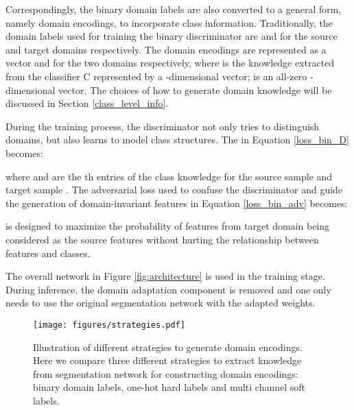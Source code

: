 \documentclass[runningheads]{llncs}
\begin{document}
Correspondingly, the binary domain labels are also converted to a general form, namely domain encodings, to incorporate class information. Traditionally, the domain labels used for training the binary discriminator are  and  for the source and target domains respectively. The domain encodings are represented as a vector  and  for the two domains respectively, where  is the knowledge extracted from the classifier C represented by a -dimensional vector;  is an all-zero -dimensional vector. The choices of how to generate domain knowledge  will be discussed in Section \ref{class_level_info}.



During the training process, the discriminator not only tries to distinguish domains, but also learns to model class structures. The  in Equation \ref{loss_bin_D} becomes: 





where  and  are the th entries of the class knowledge for the source sample  and target sample . The adversarial loss  used to confuse the discriminator and guide the generation of domain-invariant features in Equation \ref{loss_bin_adv}  becomes:






 is designed to maximize the probability of features from target domain being considered as the source features without hurting the relationship between features and classes.





The overall network in Figure \ref{fig:architecture} is used in the training stage. During inference, the domain adaptation component is removed and one only needs to use the original segmentation network with the adapted weights. 
\iffalse
Previous adversarial methods mainly align the whole feature maps using a binary methods. However, different classes between two domains suffers from different level shift. A global alignment would inevitably cause class mismatch during the process of alignment. Here, we propose a fine-grained domain discriminator to replace the naive binary domain classifier. Instead of distinguishing domains of patches, our class-aware domain discriminator could distinguish domains and classes at the same time. More specifically, we extend the traditional binary discriminator to a multi-channel discriminator with  channels. 
\fi

\begin{figure}[t]
\centering
   \texttt{[image: figures/strategies.pdf]}
   \caption{Illustration of different strategies to generate domain encodings. Here we compare three different strategies to extract knowledge from segmentation network for constructing domain encodings: binary domain labels, one-hot hard labels and multi channel soft labels.}
\label{fig:strategies}
\end{figure}
\end{document}
